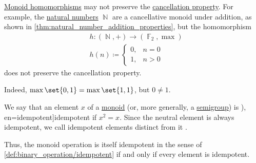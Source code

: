 \begin{example}\label{ex:monoid_cancellation_not_preserved_by_homomorphism}
  \hyperref[def:monoid/homomorphism]{Monoid homomorphisms} may not preserve the \hyperref[def:binary_operation/cancellative]{cancellation property}. For example, the \hyperref[def:natural_numbers]{natural numbers} \( \BbbN \) are a cancellative monoid under addition, as shown in \cref{thm:natural_number_addition_properties}, but the homomorphism
  \begin{equation*}
    \begin{aligned}
      &h: (\BbbN, +) \to (\BbbF_2, \max) \\
      &h(n) \coloneqq \begin{cases}
        0, &n = 0 \\
        1, &n > 0
      \end{cases}
    \end{aligned}
  \end{equation*}
  does not preserve the cancellation property.

  Indeed, \( \max\set{ 0, 1 } = \max\set{ 1, 1 } \), but \( 0 \neq 1 \).
\end{example}

\begin{definition}\label{def:monoid_idempotent}\cite[1]{Golan1999Semirings}
  We say that an element \( x \) of a \hyperref[def:monoid]{monoid} (or, more generally, a \hyperref[def:semigroup]{semigroup}) is \term[ru=идемпотент (\cite[72]{Ляпин1960Полугруппы}), en=idempotent]{idempotent} if \( x^2 = x \). Since the neutral element is always idempotent, we call idempotent elements distinct from it .
\end{definition}
\begin{comments}
  \item Thus, the monoid operation is itself idempotent in the sense of \cref{def:binary_operation/idempotent} if and only if every element is idempotent.
\end{comments}
